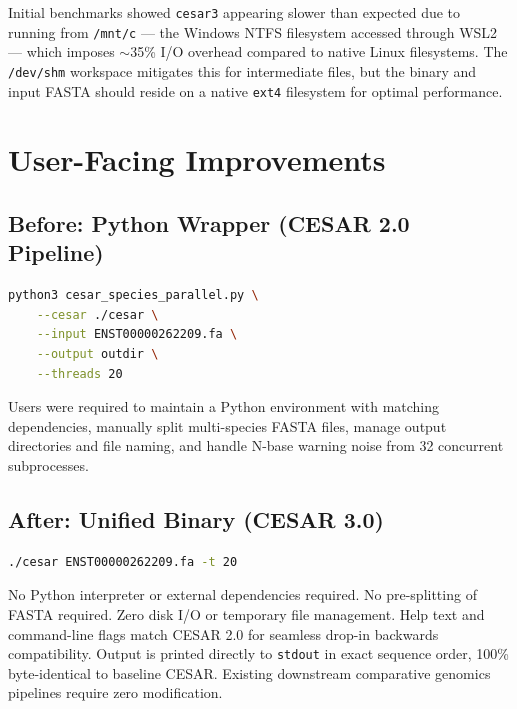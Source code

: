 \documentclass[12pt,a4paper]{article}
\begin{document}
Initial benchmarks showed \texttt{cesar3} appearing slower than expected due to running
from \texttt{/mnt/c} --- the Windows NTFS filesystem accessed through WSL2 --- which
imposes $\sim$35\% I/O overhead compared to native Linux filesystems. The
\texttt{/dev/shm} workspace mitigates this for intermediate files, but the binary and
input FASTA should reside on a native \texttt{ext4} filesystem for optimal performance.

\section{User-Facing Improvements}

\subsection{Before: Python Wrapper (CESAR 2.0 Pipeline)}

\begin{lstlisting}[language=bash]
python3 cesar_species_parallel.py \
    --cesar ./cesar \
    --input ENST00000262209.fa \
    --output outdir \
    --threads 20
\end{lstlisting}

Users were required to maintain a Python environment with matching dependencies,
manually split multi-species FASTA files, manage output directories and file naming,
and handle N-base warning noise from 32 concurrent subprocesses.

\subsection{After: Unified Binary (CESAR 3.0)}

\begin{lstlisting}[language=bash]
./cesar ENST00000262209.fa -t 20
\end{lstlisting}

No Python interpreter or external dependencies required. No pre-splitting of FASTA required.
Zero disk I/O or temporary file management. Help text and command-line flags match CESAR 2.0
for seamless drop-in backwards compatibility. Output is printed directly to \texttt{stdout} in
exact sequence order, 100\% byte-identical to baseline CESAR. Existing downstream comparative
genomics pipelines require zero modification.

\end{document}
